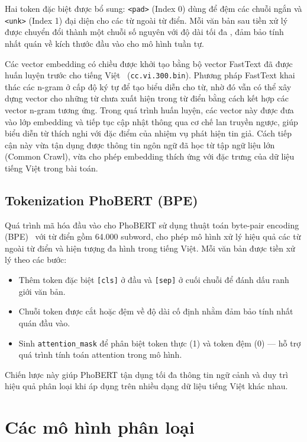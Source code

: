 Hai token đặc biệt được bổ sung: \texttt{<pad>} (Index 0) dùng để đệm các chuỗi ngắn và \texttt{<unk>} (Index 1) đại diện cho các từ ngoài từ điển. Mỗi văn bản sau tiền xử lý được chuyển đổi thành một chuỗi số nguyên với độ dài tối đa \bilstmmaxseq, đảm bảo tính nhất quán về kích thước đầu vào cho mô hình tuần tự.

Các vector embedding có chiều \bilstmembdim{} được khởi tạo bằng bộ vector FastText đã được huấn luyện trước cho tiếng Việt~\cite{bojanowski2017fasttext} (\texttt{cc.vi.300.bin}). Phương pháp FastText khai thác các n-gram ở cấp độ ký tự để tạo biểu diễn cho từ, nhờ đó vẫn có thể xây dựng vector cho những từ chưa xuất hiện trong từ điển bằng cách kết hợp các vector n-gram tương ứng. Trong quá trình huấn luyện, các vector này được đưa vào lớp embedding và tiếp tục cập nhật thông qua cơ chế lan truyền ngược, giúp biểu diễn từ thích nghi với đặc điểm của nhiệm vụ phát hiện tin giả. Cách tiếp cận này vừa tận dụng được thông tin ngôn ngữ đã học từ tập ngữ liệu lớn (Common Crawl), vừa cho phép embedding thích ứng với đặc trưng của dữ liệu tiếng Việt trong bài toán.

\subsection{Tokenization PhoBERT (BPE)}

Quá trình mã hóa đầu vào cho PhoBERT sử dụng thuật toán byte-pair encoding (BPE)~\cite{sennrich2016bpe} với từ điển gồm 64.000 subword, cho phép mô hình xử lý hiệu quả các từ ngoài từ điển và hiện tượng đa hình trong tiếng Việt. Mỗi văn bản được tiền xử lý theo các bước:
\begin{itemize}[leftmargin=2em]
  \item Thêm token đặc biệt \texttt{[cls]} ở đầu và \texttt{[sep]} ở cuối chuỗi để đánh dấu ranh giới văn bản.
  \item Chuỗi token được cắt hoặc đệm về độ dài cố định \phobertmaxseq{} nhằm đảm bảo tính nhất quán đầu vào.
  \item Sinh \texttt{attention\_mask} để phân biệt token thực (1) và token đệm (0) --- hỗ trợ quá trình tính toán attention trong mô hình.
\end{itemize}

Chiến lược này giúp PhoBERT tận dụng tối đa thông tin ngữ cảnh và duy trì hiệu quả phân loại khi áp dụng trên nhiều dạng dữ liệu tiếng Việt khác nhau.

\section{Các mô hình phân loại}

